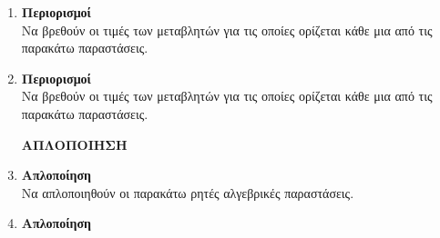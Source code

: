 \documentclass{askhseis}
\begin{document}
\begin{enumerate}
\item \textbf{Περιορισμοί}\\
Να βρεθούν οι τιμές των μεταβλητών για τις οποίες ορίζεται κάθε μια από τις παρακάτω παραστάσεις.
\begin{multicols}{3}
\end{multicols}
\item \textbf{Περιορισμοί}\\
Να βρεθούν οι τιμές των μεταβλητών για τις οποίες ορίζεται κάθε μια από τις παρακάτω παραστάσεις.
\begin{multicols}{2}
\end{multicols}
\begin{center}
\textbf{ΑΠΛΟΠΟΙΗΣΗ}
\end{center}
\item \textbf{Απλοποίηση}\\
Να απλοποιηθούν οι παρακάτω ρητές αλγεβρικές παραστάσεις.
\begin{multicols}{3}
\end{multicols}
\item \textbf{Απλοποίηση}\\

\end{enumerate}
\end{document}
